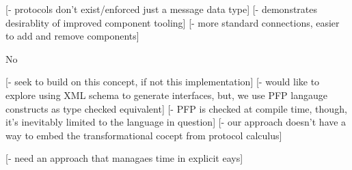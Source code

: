 
[- protocols don't exist/enforced just a message data type]
	[- demonstrates desirablity of improved component tooling]
	[- more standard connections, easier to add and remove components]

No 

[- seek to build on this concept, if not this implementation]
	[- would like to explore using XML schema to generate interfaces, but, we use PFP langauge constructs as type checked equivalent]
	[- PFP is checked at compile time, though, it's inevitably limited to the language in question]
	[- our approach doesn't have a way to embed the transformational cocept from protocol calculus]

[- need an approach that managaes time in explicit eays]